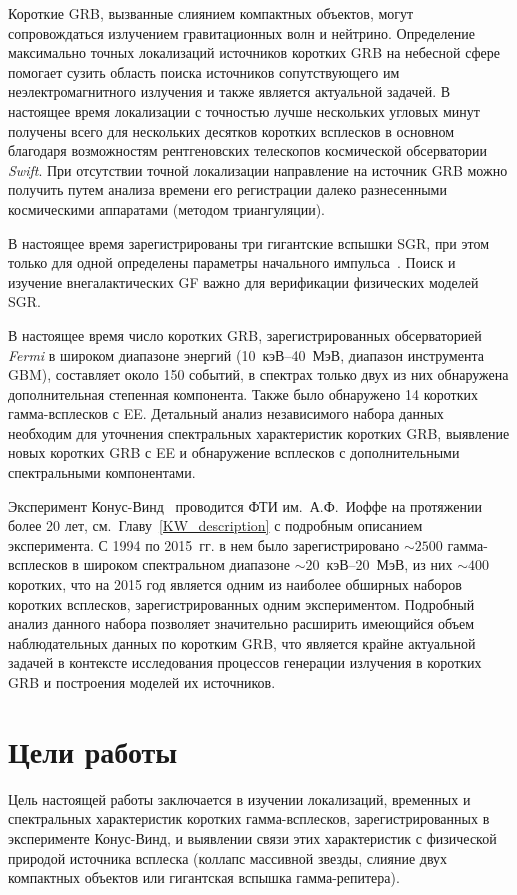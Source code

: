 Короткие GRB, вызванные слиянием компактных объектов, могут сопровождаться 
излучением гравитационных волн и нейтрино. Определение максимально точных 
локализаций источников коротких GRB на небесной сфере помогает сузить область поиска источников 
сопутствующего им неэлектромагнитного излучения и также является актуальной задачей. 
В настоящее время локализации с точностью лучше 
нескольких угловых минут получены всего для нескольких десятков коротких всплесков
в основном благодаря возможностям рентгеновских телескопов космической обсерватории \textit{Swift}.
При отсутствии точной локализации направление на источник GRB можно получить путем 
анализа времени его регистрации далеко разнесенными космическими аппаратами (методом триангуляции).

В настоящее время зарегистрированы три гигантские вспышки SGR, при этом только для одной 
определены параметры начального импульса~\citep{Frederiks2007}.
Поиск и изучение внегалактических GF важно для верификации физических моделей SGR.

В настоящее время число коротких GRB, зарегистрированных обсерваторией \textit{Fermi}
в широком диапазоне энергий (10~кэВ--40~МэВ, диапазон инструмента GBM), составляет около 150 событий, 
в спектрах только двух из них обнаружена дополнительная степенная компонента.
Также было обнаружено 14 коротких гамма-всплесков с EE.
Детальный анализ независимого набора данных необходим для уточнения 
спектральных характеристик коротких GRB, выявление новых коротких GRB с EE и 
обнаружение всплесков с дополнительными спектральными компонентами.

Эксперимент Конус-Винд~\citep{Aptekar_1995SSR} проводится ФТИ им.~А.Ф.~Иоффе на протяжении более 20 лет, 
см.~Главу~\ref{KW_description} с подробным описанием эксперимента.
С 1994 по 2015~гг. в нем  было зарегистрировано 
$\sim 2500$ гамма-всплесков в широком спектральном диапазоне $\sim 20$~кэВ--20~МэВ,
из них $\sim 400$ коротких, что на 2015 год является 
одним из наиболее обширных наборов коротких всплесков, зарегистрированных 
одним экспериментом. Подробный анализ данного набора позволяет значительно расширить 
имеющийся объем наблюдательных данных по коротким GRB, что является крайне актуальной 
задачей в контексте исследования процессов генерации излучения в коротких GRB 
и построения моделей их источников.

\section*{Цели работы}
Цель настоящей работы заключается в изучении локализаций, временных и спектральных характеристик 
коротких гамма-всплесков, зарегистрированных в эксперименте Конус-Винд, и выявлении 
связи этих характеристик с физической природой источника всплеска 
(коллапс массивной звезды, слияние двух компактных объектов или гигантская вспышка гамма-репитера).

